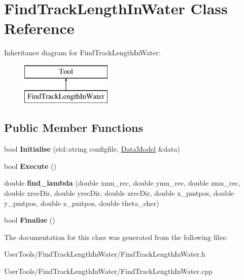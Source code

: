 \hypertarget{classFindTrackLengthInWater}{\section{Find\-Track\-Length\-In\-Water Class Reference}
\label{classFindTrackLengthInWater}
}
Inheritance diagram for Find\-Track\-Length\-In\-Water\-:\begin{figure}[H]
\begin{center}
\leavevmode
\includegraphics[height=2.000000cm]{classFindTrackLengthInWater}
\end{center}
\end{figure}
\subsection*{Public Member Functions}
\begin{DoxyCompactItemize}
\item 
\hypertarget{classFindTrackLengthInWater_a0f902c566760c2df0693cf00e99cc47e}{bool {\bfseries Initialise} (std\-::string configfile, \hyperlink{classDataModel}{Data\-Model} \&data)}\label{classFindTrackLengthInWater_a0f902c566760c2df0693cf00e99cc47e}

\item 
\hypertarget{classFindTrackLengthInWater_a27d29773eced4222f316ade698247d50}{bool {\bfseries Execute} ()}\label{classFindTrackLengthInWater_a27d29773eced4222f316ade698247d50}

\item 
\hypertarget{classFindTrackLengthInWater_a714975810be358a8b6c127a9b7992dc6}{double {\bfseries find\-\_\-lambda} (double xmu\-\_\-rec, double ymu\-\_\-rec, double zmu\-\_\-rec, double xrec\-Dir, double yrec\-Dir, double zrec\-Dir, double x\-\_\-pmtpos, double y\-\_\-pmtpos, double z\-\_\-pmtpos, double theta\-\_\-cher)}\label{classFindTrackLengthInWater_a714975810be358a8b6c127a9b7992dc6}

\item 
\hypertarget{classFindTrackLengthInWater_a1e9e6eaefc14833736544ebffb39eb1c}{bool {\bfseries Finalise} ()}\label{classFindTrackLengthInWater_a1e9e6eaefc14833736544ebffb39eb1c}

\end{DoxyCompactItemize}


The documentation for this class was generated from the following files\-:\begin{DoxyCompactItemize}
\item 
User\-Tools/\-Find\-Track\-Length\-In\-Water/Find\-Track\-Length\-In\-Water.\-h\item 
User\-Tools/\-Find\-Track\-Length\-In\-Water/Find\-Track\-Length\-In\-Water.\-cpp\end{DoxyCompactItemize}
